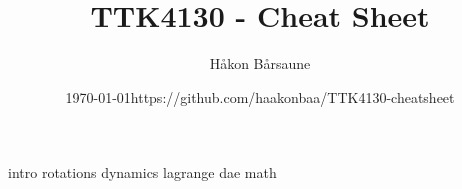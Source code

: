 \documentclass{article}
\title{TTK4130 - Cheat Sheet}
\author{Håkon Bårsaune}
\date{\centering\today\endgraf\bigskip https://github.com/haakonbaa/TTK4130-cheatsheet}
\begin{document}
\maketitle

\tableofcontents

\newpage

\begin{multicols}{2}
{intro}
{rotations}
{dynamics}
{lagrange} 
{dae}\newpage
{math}
\end{multicols}
\end{document}
